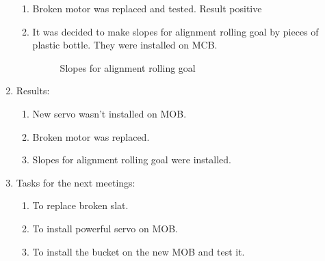 \begin{enumerate}
\begin{enumerate}
	  \item Broken motor was replaced and tested. Result positive
	  
	  \item It was decided to make slopes for alignment rolling goal  by pieces of plastic bottle. They were installed on MCB. 
      \begin{figure}[H]
      	\begin{minipage}[h]{1\linewidth}
      		\caption{Slopes for alignment rolling goal}
      	\end{minipage}
      \end{figure}	
      
 	\end{enumerate}
 	\item Results:
 	\begin{enumerate}
 		
 		\item New servo wasn't installed on MOB.
 		
 		\item Broken motor was replaced.
 		
 		\item Slopes for alignment rolling goal were installed.
 		 
 	\end{enumerate}
 	\item Tasks for the next meetings:
 	\begin{enumerate}
 		
 		\item To replace broken slat.
 		
 		\item To install powerful servo on MOB.
 		
 		\item To install the bucket on the new MOB and test it.
 				
 	\end{enumerate}
\end{enumerate}
\fillpage